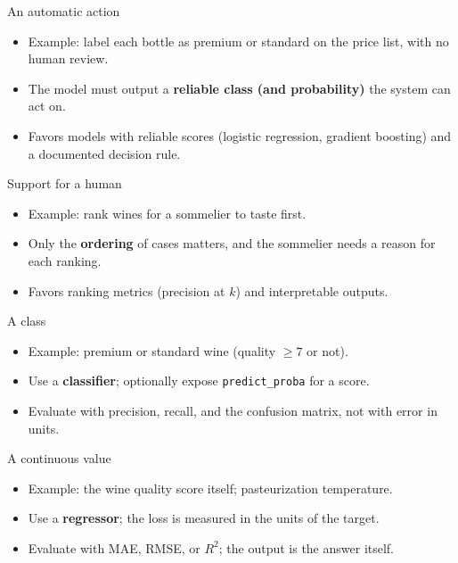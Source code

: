 {An automatic action}
{\begin{itemize}
\item Example: label each bottle as premium or standard on the price list, with no human review.
\item The model must output a \textbf{reliable class (and probability)} the system can act on.
\item Favors models with reliable scores (logistic regression, gradient boosting) and a documented decision rule.
\end{itemize}}
{Support for a human}
{\begin{itemize}
\item Example: rank wines for a sommelier to taste first.
\item Only the \textbf{ordering} of cases matters, and the sommelier needs a reason for each ranking.
\item Favors ranking metrics (precision at $k$) and interpretable outputs.
\end{itemize}}

{A class}
{\begin{itemize}
\item Example: premium or standard wine (quality $\ge 7$ or not).
\item Use a \textbf{classifier}; optionally expose \texttt{predict\_proba} for a score.
\item Evaluate with precision, recall, and the confusion matrix, not with error in units.
\end{itemize}}
{A continuous value}
{\begin{itemize}
\item Example: the wine quality score itself; pasteurization temperature.
\item Use a \textbf{regressor}; the loss is measured in the units of the target.
\item Evaluate with MAE, RMSE, or $R^2$; the output is the answer itself.
\end{itemize}}

